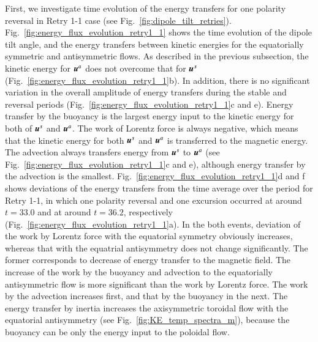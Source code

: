 First, we investigate time evolution of the energy transfers for one polarity reversal in Retry 1-1 case (see Fig.~\ref{fig:dipole_tilt_retries}). 
Fig.~\ref{fig:energy_flux_evolution_retry1_1} shows the time evolution of the dipole tilt angle, and the energy transfers between kinetic energies for the equatorially symmetric and antisymmetric flows.
 As described in the previous subsection, the kinetic energy for $\mbox{\boldmath$u$}^a$ does not overcome that for $\mbox{\boldmath$u$}^s$ (Fig.~\ref{fig:energy_flux_evolution_retry1_1}b).
In addition, there is no significant variation in the overall amplitude of energy transfers during the stable and reversal periods (Fig.~\ref{fig:energy_flux_evolution_retry1_1}c and e).
Energy transfer by the buoyancy is the largest energy input to the kinetic energy for both of $\mbox{\boldmath$u$}^s$ and $\mbox{\boldmath$u$}^a$.
The work of Lorentz force is always negative, which means that the kinetic energy for both $\mbox{\boldmath$u$}^s$ and $\mbox{\boldmath$u$}^a$ is transferred to the magnetic energy.
The advection always transfers energy from $\mbox{\boldmath$u$}^s$ to $\mbox{\boldmath$u$}^a$ (see Fig.~\ref{fig:energy_flux_evolution_retry1_1}c and e), although energy transfer by the advection is the smallest.
Fig.~\ref{fig:energy_flux_evolution_retry1_1}d and f shows deviations of the energy transfers from the time average over the period for Retry 1-1, in which one polarity reversal and one excursion occurred at around $t = 33.0$ and at around $t = 36.2$, respectively (Fig.~\ref{fig:energy_flux_evolution_retry1_1}a).
In the both events, deviation of the work by Lorentz force with the equatorial symmetry obviously increases, whereas that with the equatrial antisymmetry does not change significantly.
The former corresponds to decrease of energy transfer to the magnetic field.
The increase of the work by the buoyancy and advection to the equatorially antisymmetric flow is more significant than the work by Lorentz force.
The work by the advection increases first, and that by the buoyancy in the next. 
The energy transfer by inertia increases the axisymmetric toroidal flow with the equatorial antisymmetry (see Fig.~\ref{fig:KE_temp_spectra_m}), because the buoyancy can be only the energy input to the poloidal flow.




